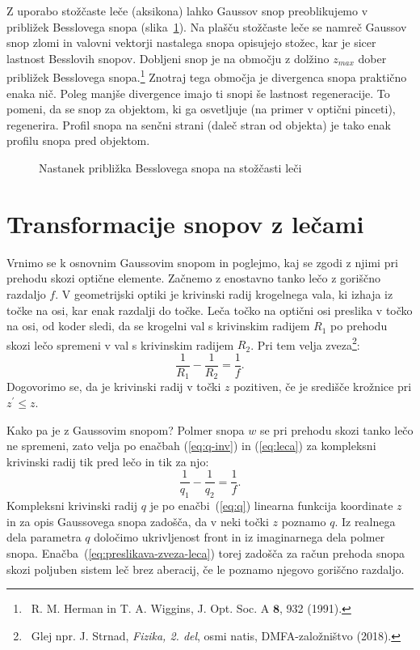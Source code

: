 \begin{remark}
Z uporabo stožčaste leče (aksikona) lahko Gaussov snop
preoblikujemo v približek Besslovega snopa (slika~\ref{fig:Bessel_leca}). 
Na plašču stožčaste leče se namreč Gaussov snop zlomi in valovni vektorji 
nastalega snopa opisujejo stožec, kar je sicer lastnost Besslovih snopov.
Dobljeni snop je na območju z dolžino $z_{max}$ dober približek Besslovega 
snopa.\footnote{~R. M. Herman in T. A. Wiggins, J. Opt. Soc. A $\mathbf{8}$, 932 (1991).}
Znotraj tega območja je divergenca snopa praktično enaka nič. Poleg manjše divergence
imajo ti snopi še lastnost regeneracije. To pomeni, da se snop 
za objektom, ki ga osvetljuje (na primer v optični pinceti), regenerira. 
Profil snopa na senčni strani (daleč stran od objekta) je tako enak profilu 
snopa pred objektom. 
\begin{figure}[ht]
\centering
\def\svgwidth{90truemm} 

\caption{Nastanek približka Besslovega snopa na stožčasti leči}
\label{fig:Bessel_leca}
\end{figure}
\end{remark}

\section{Transformacije snopov z lečami}
Vrnimo se k osnovnim Gaussovim snopom in poglejmo, kaj se zgodi z njimi pri prehodu
skozi optične elemente. Začnemo
z enostavno tanko lečo z goriščno razdaljo $f$. V geometrijski optiki
je krivinski radij krogelnega vala, ki izhaja iz točke na osi, kar
enak razdalji do točke. Leča točko na optični osi preslika v točko na osi,
od koder sledi, da se krogelni val s krivinskim radijem $R_{1}$
po prehodu skozi lečo spremeni v val s krivinskim radijem $R_{2}$.
Pri tem velja zveza\footnote{~Glej npr. J. Strnad, {\it Fizika, 2. del}, osmi natis, DMFA-založništvo (2018).}:
\begin{equation}
\frac{1}{R_{1}}-\frac{1}{R_{2}}=\frac{1}{f}.
\label{eq:leca}
\end{equation}
Dogovorimo se, da je krivinski radij v točki $z$ pozitiven, če je središče krožnice pri $z^{\prime}\le z$.

Kako pa je z Gaussovim snopom? Polmer snopa $w$ se pri prehodu 
skozi tanko lečo ne spremeni, zato velja po enačbah (\ref{eq:q-inv}) in 
(\ref{eq:leca}) za kompleksni krivinski radij tik pred lečo in tik za njo:
\begin{equation}
\frac{1}{q_{1}}-\frac{1}{q_{2}}=\frac{1}{f}.
\label{eq:preslikava-zveza-leca}
\end{equation}
Kompleksni krivinski radij $q$ je po enačbi~(\ref{eq:q}) linearna 
funkcija koordinate $z$ in za opis Gaussovega snopa zadošča, da
v neki točki $z$ poznamo $q$. Iz realnega dela parametra $q$ določimo ukrivljenost front in iz 
imaginarnega dela polmer snopa. Enačba~(\ref{eq:preslikava-zveza-leca}) torej
zadošča za račun prehoda snopa skozi poljuben sistem leč brez aberacij, če le poznamo
njegovo goriščno razdaljo.


